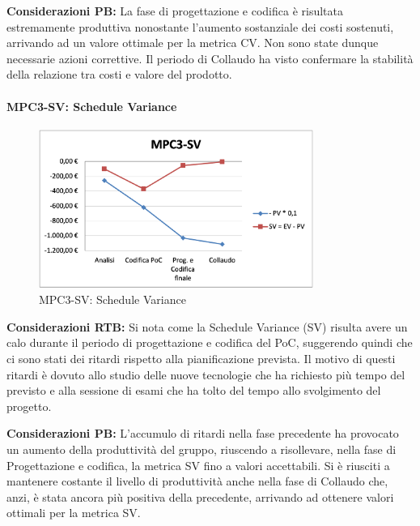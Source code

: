 \vspace{0.5cm}
\noindent \textbf{Considerazioni PB:} La fase di progettazione e codifica è risultata estremamente produttiva nonostante l'aumento sostanziale dei costi sostenuti, arrivando ad un valore ottimale per la metrica CV. Non sono state dunque necessarie azioni correttive. Il periodo di Collaudo ha visto confermare la stabilità della relazione tra costi e valore del prodotto. 


\paragraph{MPC3-SV: Schedule Variance}
\begin{figure}[h!]
    \centering
    \includegraphics[width=0.8\textwidth]{images/MPC3-SV.png}
    \caption{MPC3-SV: Schedule Variance}
\end{figure}
\noindent \textbf{Considerazioni RTB:} Si nota come la Schedule Variance (SV) risulta avere un calo durante il periodo di progettazione e codifica del PoC, suggerendo quindi che ci sono stati dei ritardi rispetto alla pianificazione prevista. Il motivo di questi ritardi è dovuto allo studio delle nuove tecnologie che ha richiesto più tempo del previsto e alla sessione di esami che ha tolto del tempo allo svolgimento del progetto.

\vspace{0.5cm}
\noindent \textbf{Considerazioni PB:} L'accumulo di ritardi nella fase precedente ha provocato un aumento della produttività del gruppo, riuscendo a risollevare, nella fase di Progettazione e codifica, la metrica SV fino a valori accettabili. Si è riusciti a mantenere costante il livello di produttività anche nella fase di Collaudo che, anzi, è stata ancora più positiva della precedente, arrivando ad ottenere valori ottimali per la metrica SV.

